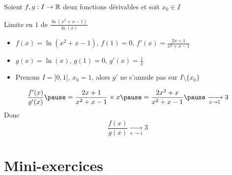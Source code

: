 \begin{frame}

\begin{corollaire}
Soient $f,g : I \to \mathbb{R}$ deux fonctions dérivables et soit $x_0\in I$ 
\end{corollaire}

\end{frame}


\begin{frame}
\begin{exemple}
Limite en $1$ de $\frac{\ln(x^2+x-1)}{\ln(x)}$

\pause

\begin{itemize}
  \item $f(x)=\ln(x^2+x-1)$, $f(1)=0$, $f'(x)=\frac{2x+1}{x^2+x-1}$
\pause
  \item $g(x)=\ln(x)$, $g(1)=0$, $g'(x)=\frac 1x$
\pause
  \item Prenons $I=]0,1]$, $x_0=1$, alors $g'$ ne s'annule pas sur $I\setminus\{x_0\}$
\end{itemize}
\pause
$$\frac{f'(x)}{g'(x)} \pause = \frac{2x+1}{x^2+x-1} \times x \pause = \frac{2x^2+x}{x^2+x-1} \pause \xrightarrow[x\to 1]{} 3$$
\pause
Donc 
$$\frac{f(x)}{g(x)} \xrightarrow[x\to 1]{} 3$$
\end{exemple}
\end{frame}



\section*{Mini-exercices}


